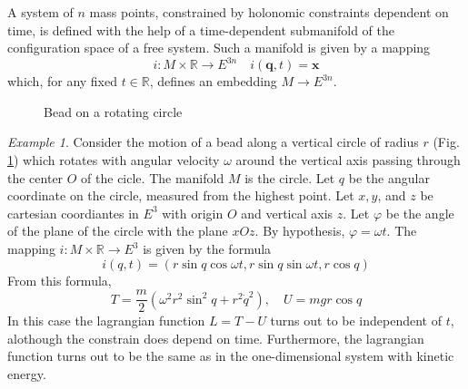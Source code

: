 \documentclass[conference]{IEEEtran}
\theoremstyle{definition}
\theoremstyle{remark}
\newtheorem{exmp}{Example}
\begin{document}
    A system of $n$ mass points, constrained by holonomic constraints dependent on time, is defined with the help of a time-dependent submanifold of the configuration space of a free system. Such a manifold is given by a mapping
    \begin{equation*}
        i: M \times \mathbb{R} \to E^{3n} \quad i(\mathbf{q}, t) = \mathbf{x}
    \end{equation*}
    which, for any fixed $t \in \mathbb{R}$, defines an embedding $M \to E^{3n}$.

    \begin{figure}[h]
        \centering
        \caption{Bead on a rotating circle}
        \label{fig:bead_circle}
    \end{figure}

    \begin{exmp}
        Consider the motion of a bead along a vertical circle of radius $r$ (Fig. \ref{fig:bead_circle}) which rotates with angular velocity $\omega$ around the vertical axis passing through the center $O$ of the cicle. The manifold $M$ is the circle. Let $q$ be the angular coordinate on the circle, measured from the highest point. Let $x, y$, and $z$ be cartesian coordiantes in $E^3$ with origin $O$ and vertical axis $z$. Let $\varphi$ be the angle of the plane of the circle with the plane $xOz$. By hypothesis, $\varphi = \omega t$. The mapping $i: M \times \mathbb{R} \to E^3$ is given by the formula
        \begin{equation*}
            i(q, t) = (r \sin q \cos \omega t, r \sin q \sin \omega t, r \cos q)
        \end{equation*}
        From this formula,
        \begin{equation*}
            T = \dfrac{m}{2} (\omega^2 r^2 \sin^2 q + r^2 \dot{q}^2), \quad U = mgr \cos q
        \end{equation*}
        In this case the lagrangian function $L = T - U$ turns out to be independent of $t$, alothough the constrain does depend on time. Furthermore, the lagrangian function turns out to be the same as in the one-dimensional system with kinetic energy.
    \end{exmp}
\end{document}

